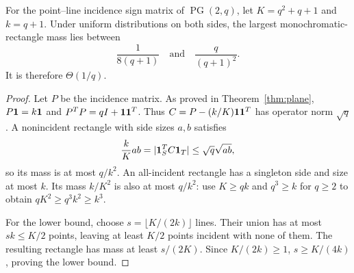 \begin{samepage}
\begin{proposition}\label{prop:pg-rect}
For the point--line incidence sign matrix of $\operatorname{PG}(2,q)$, let $K=q^2+q+1$ and $k=q+1$. Under uniform distributions on both sides, the largest monochromatic-rectangle mass lies between
\[
 \frac1{8(q+1)}\quad\text{and}\quad\frac{q}{(q+1)^2}.
\]
It is therefore $\Theta(1/q)$.
\end{proposition}
\end{samepage}
\begin{proof}
Let $P$ be the incidence matrix. As proved in Theorem~\ref{thm:plane}, $P\mathbf 1=k\mathbf 1$ and $P^TP=qI+\mathbf 1\mathbf 1^T$. Thus $C=P-(k/K)\mathbf 1\mathbf 1^T$ has operator norm $\sqrt q$. A nonincident rectangle with side sizes $a,b$ satisfies
\[
 \frac{k}{K}ab=|\mathbf 1_S^TC\mathbf 1_T|\le\sqrt q\sqrt{ab},
\]
so its mass is at most $q/k^2$. An all-incident rectangle has a singleton side and size at most $k$. Its mass $k/K^2$ is also at most $q/k^2$: use $K\ge qk$ and $q^3\ge k$ for $q\ge2$ to obtain $qK^2\ge q^3k^2\ge k^3$.

For the lower bound, choose $s=\lfloor K/(2k)\rfloor$ lines. Their union has at most $sk\le K/2$ points, leaving at least $K/2$ points incident with none of them. The resulting rectangle has mass at least $s/(2K)$. Since $K/(2k)\ge1$, $s\ge K/(4k)$, proving the lower bound.
\end{proof}
